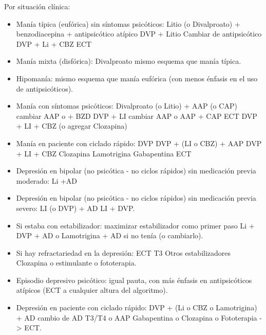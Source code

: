 \documentclass{scrbook}
\begin{document}
Por situación clínica:
\begin{itemize}
	\item Manía típica (eufórica) sin síntomas psicóticos: Litio (o Divalproato) \faArrowCircleRight + benzodiacepina \faArrowCircleRight + antipsicótico atípico \faArrowCircleRight DVP + Litio \faArrowCircleRight Cambiar de antipsicótico \faArrowCircleRight DVP + Li + CBZ \faArrowCircleRight ECT
	\item Manía mixta (disfórica): Divalproato \faArrowCircleRight mismo esquema que manía típica.
	\item Hipomanía: mismo esquema que manía eufórica (con menos énfasis en el uso de antipsicóticos).
	\item Manía con síntomas psicóticos: Divalproato (o Litio) + AAP (o CAP) \faArrowCircleRight cambiar AAP o + BZD \faArrowCircleRight DVP + LI \faArrowCircleRight cambiar AAP o AAP + CAP \faArrowCircleRight ECT \faArrowCircleRight DVP + LI + CBZ (o agregar Clozapina)
	\item Manía en paciente con ciclado rápido: DVP \faArrowCircleRight DVP + (LI o CBZ) \faArrowCircleRight + AAP \faArrowCircleRight DVP + LI + CBZ \faArrowCircleRight Clozapina \faArrowCircleRight Lamotrigina \faArrowCircleRight Gabapentina \faArrowCircleRight ECT
	\item Depresión en bipolar (no psicótica - no ciclos rápidos) sin medicación previa moderado: Li \faArrowCircleRight +AD
	\item Depresión en bipolar (no psicótica - no ciclos rápidos) sin medicación previa severo: LI (o DVP) + AD \faArrowCircleRight LI + DVP.
	\item Si estaba con estabilizador: maximizar estabilizador como primer paso \faArrowCircleRight Li + DVP \faArrowCircleRight + AD o Lamotrigina \faArrowCircleRight + AD si no tenía (o cambiarlo).
	\item Si hay refractariedad en la depresión: ECT \faArrowCircleRight T3 \faArrowCircleRight Otros estabilizadores \faArrowCircleRight Clozapina o estimulante o fototerapia.
	\item Episodio depresivo psicótico: igual pauta, con más énfasis en antipsicóticos atípicos (ECT a cualquier altura del algoritmo).
	\item Depresión en paciente con ciclado rápido: DVP \faArrowCircleRight + (Li o CBZ o Lamotrigina) \faArrowCircleRight + AD \faArrowCircleRight cambio de AD \faArrowCircleRight T3/T4 o AAP \faArrowCircleRight Gabapentina o Clozapina o Fototerapia -> ECT.
\end{itemize}
\end{document}
